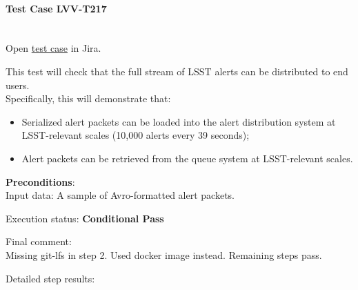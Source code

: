 \documentclass[DM,lsstdraft,STR,toc]{lsstdoc}
\providecommand{\tightlist}{
  \setlength{\itemsep}{0pt}\setlength{\parskip}{0pt}}
\begin{document}
    \paragraph{Test Case LVV-T217 }\mbox{}\\

Open \href{https://jira.lsstcorp.org/secure/Tests.jspa#/testCase/LVV-T217}{test case} in Jira.

    This test will check that the full stream of LSST alerts can be
distributed to end users.\\[2\baselineskip]Specifically, this will
demonstrate that:

\begin{itemize}
\tightlist
\item
  Serialized alert packets can be loaded into the alert distribution
  system at LSST-relevant scales (10,000 alerts every 39 seconds);
\item
  Alert packets can be retrieved from the queue system at LSST-relevant
  scales.
\end{itemize}


    {\bf Preconditions}:\\
    Input data: A sample of Avro-formatted alert packets.


    Execution status: {\bf Conditional Pass }

    Final comment:\\Missing git-lfs in step 2. Used docker image instead. Remaining steps
pass.



    Detailed step results:
\end{document}
